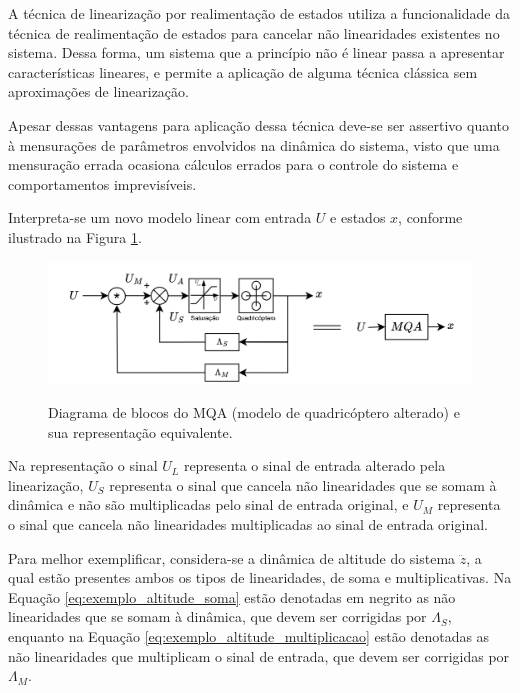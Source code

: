 \documentclass[main.tex]{subfiles}
\begin{document}
\textcolor{att}{
A técnica de linearização por realimentação de estados utiliza a funcionalidade da técnica de realimentação de estados para cancelar não linearidades existentes no sistema. Dessa forma, um sistema que a princípio não é linear passa a apresentar características lineares, e permite a aplicação de alguma técnica clássica sem aproximações de linearização.
}

\textcolor{att}{
Apesar dessas vantagens para aplicação dessa técnica deve-se ser assertivo quanto à mensurações de parâmetros envolvidos na dinâmica do sistema, visto que uma mensuração errada ocasiona cálculos errados para o controle do sistema e comportamentos imprevisíveis.
}

\textcolor{att}{
Interpreta-se um novo modelo linear com entrada $U$ e estados $x$, conforme ilustrado na Figura \ref{fig:mqm}.}

\begin{figure}[!h]
    \centering
    \caption{Diagrama de blocos do MQA (modelo de quadricóptero alterado) e sua representação equivalente.}
    \includegraphics[width=1\textwidth]{capitulos/controle_atitude/imgs/mqa.png}
    \label{fig:mqm}
\end{figure}

\textcolor{att}{
Na representação o sinal $U_L$ representa o sinal de entrada alterado pela linearização, $U_S$ representa o sinal que cancela não linearidades que se somam à dinâmica e não são multiplicadas pelo sinal de entrada original, e $U_M$ representa o sinal que cancela não linearidades multiplicadas ao sinal de entrada original. 
}

\textcolor{att}{
Para melhor exemplificar, considera-se a dinâmica de altitude do sistema $\ddot{z}$, a qual estão presentes ambos os tipos de linearidades, de soma e multiplicativas. Na Equação \ref{eq:exemplo_altitude_soma} estão denotadas em negrito as não linearidades que se somam à dinâmica, que devem ser corrigidas por $\Lambda_S$, enquanto na Equação \ref{eq:exemplo_altitude_multiplicacao} estão denotadas as não linearidades que multiplicam o sinal de entrada, que devem ser corrigidas por $\Lambda_M$.
}
\end{document}

